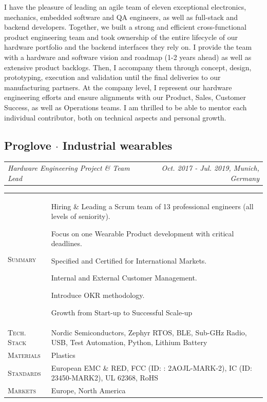 \documentclass[10pt,a4paper]{moderncv}
\newcommand*{\makecareersubsection}[5]{
  \subsection{#1 {\color{color2}$\cdot$ #2}}
  \addvspace{-0.5em}
  {\color{color2}
  \begin{tabularx}{\textwidth}{LR}
    {\itshape #3} & {\itshape #4, #5}
  \end{tabularx}}
  \par\addvspace{1em}
  }
\begin{document}
  \clearpage

  I have the pleasure of leading an agile team of eleven exceptional electronics, mechanics, embedded software and QA engineers, as well as full-stack and backend developers. Together, we built a strong and efficient cross-functional product engineering team and took ownership of the entire lifecycle of our hardware portfolio and the backend interfaces they rely on. I provide the team with a hardware and software vision and roadmap (1-2 years ahead) as well as extensive product backlogs. Then, I accompany them through concept, design, prototyping, execution and validation until the final deliveries to our manufacturing partners. At the company level, I represent our hardware engineering efforts and ensure alignments with our Product, Sales, Customer Success, as well as Operations teams. I am thrilled to be able to mentor each individual contributor, both on technical aspects and personal growth.

\vspace{0.75em}

\makecareersubsection{Proglove}{Industrial wearables}
  {Hardware Engineering Project \& Team Lead}
  {Oct. 2017 - Jul. 2019}
  {Munich, Germany}

  \begin{tabularx}{\textwidth}{>{\scshape}l@{\hskip 3.5mm}L}
    Summary & Hiring \& Leading a Scrum team of 13 professional engineers (all levels of seniority).
    \par Focus on one Wearable Product development with critical deadlines.
    \par Specified and Certified for International Markets.
    \par Internal and External Customer Management. 
    \par Introduce OKR methodology.
    \par Growth from Start-up to Successful Scale-up\\
    Tech. Stack & Nordic Semiconductors, Zephyr RTOS, BLE, Sub-GHz Radio, USB, Test Automation, Python, Lithium Battery\\
    Materials & Plastics\\
    Standards & European EMC \& RED, FCC (ID: : 2AOJL-MARK-2), IC (ID: 23450-MARK2), UL 62368, RoHS\\
    Markets & Europe, North America\\
  \end{tabularx}

  \vspace{1.5em}
\end{document}
